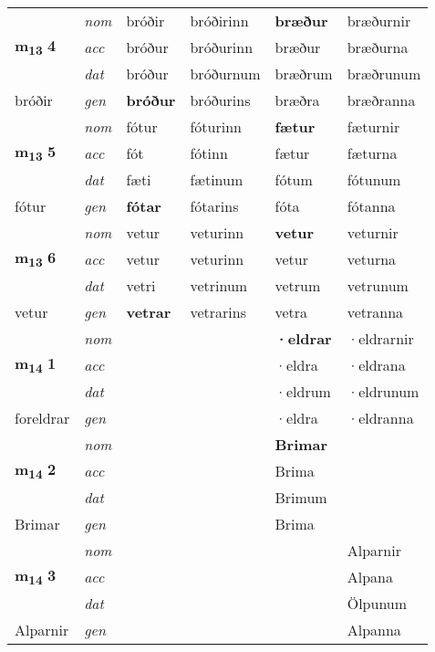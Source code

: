 \begin{longtable}[l]{X>{\footnotesize\itshape}XXXXX}
\multirow{3}{*}{{{\textbf{m{\textsubscript{13}}} \Large{\textbf{4}}}}}  
 & nom & bróðir & bróðirinn    & \textbf{bræður} & bræðurnir  \\*
 & acc & bróður  & bróðurinn   & bræður  & bræðurna \\*
 & dat & bróður & bróðurnum   & bræðrum & bræðrunum \\*
 {\footnotesize{bróðir}} &  gen & \textbf{bróður}  & bróðurins  & bræðra & bræðranna \\
\cmidrule{1-6}


\multirow{3}{*}{{{\textbf{m{\textsubscript{13}}} \Large{\textbf{5}}}}}  
 & nom & fótur & fóturinn    & \textbf{fætur} & fæturnir  \\*
 & acc & fót  & fótinn   & fætur  & fæturna \\*
 & dat & fæti & fætinum   & fótum & fótunum \\*
 {\footnotesize{fótur}} &  gen & \textbf{fótar}  & fótarins  & fóta & fótanna \\
\cmidrule{1-6}


\multirow{3}{*}{{{\textbf{m{\textsubscript{13}}} \Large{\textbf{6}}}}}  
 & nom & vetur & veturinn    & \textbf{vetur} & veturnir  \\*
 & acc & vetur  & veturinn   & vetur  & veturna \\*
 & dat & vetri & vetrinum   & vetrum & vetrunum \\*
 {\footnotesize{vetur}} &  gen & \textbf{vetrar}  & vetrarins  & vetra & vetranna \\
\cmidrule{1-6}


\multirow{3}{*}{{{\textbf{m{\textsubscript{14}}} \Large{\textbf{1}}}}}  
 & nom &  &     & \textbf{·eldrar} & ·eldrarnir  \\*
 & acc &   &    & ·eldra  & ·eldrana \\*
 & dat &  &    & ·eldrum & ·eldrunum \\*
 {\footnotesize{foreldrar}} &  gen & \textbf{}  &   & ·eldra & ·eldranna \\
\cmidrule{1-6}


\multirow{3}{*}{{{\textbf{m{\textsubscript{14}}} \Large{\textbf{2}}}}}  
 & nom &  &     & \textbf{Brimar} &   \\*
 & acc &   &    & Brima  &  \\*
 & dat &  &    & Brimum &  \\*
 {\footnotesize{Brimar}} &  gen & \textbf{}  &   & Brima &  \\
\cmidrule{1-6}


\multirow{3}{*}{{{\textbf{m{\textsubscript{14}}} \Large{\textbf{3}}}}}  
 & nom &  &     & \textbf{} & Alparnir  \\*
 & acc &   &    &   & Alpana \\*
 & dat &  &    &  & Ölpunum \\*
 {\footnotesize{Alparnir}} &  gen & \textbf{}  &   &  & Alpanna \\
\cmidrule{1-6}



\end{longtable}

